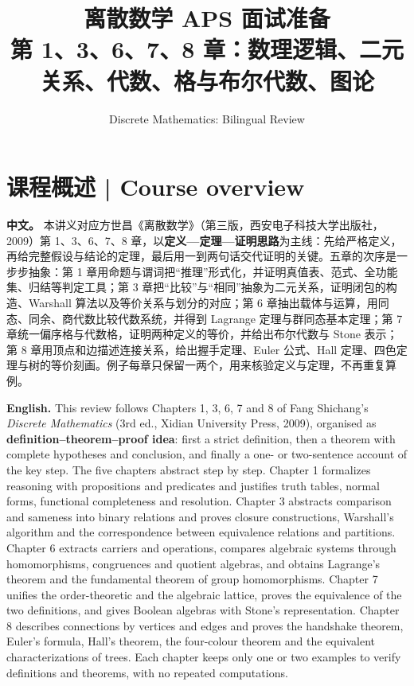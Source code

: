 \documentclass[UTF8,11pt,a4paper]{ctexart}
\title{离散数学 APS 面试准备\\[4pt]\large 第 1、3、6、7、8 章：数理逻辑、二元关系、代数、格与布尔代数、图论}
\author{Discrete Mathematics: Bilingual Review}
\date{}
\newcommand{\APS}[2]{\par\noindent\textbf{中文。} #1\par\noindent\textbf{English.} #2\par}
\begin{document}
\maketitle
\section*{课程概述 | Course overview}
\APS{本讲义对应方世昌《离散数学》（第三版，西安电子科技大学出版社，2009）第 1、3、6、7、8 章，以\textbf{定义—定理—证明思路}为主线：先给严格定义，再给完整假设与结论的定理，最后用一到两句话交代证明的关键。五章的次序是一步步抽象：第 1 章用命题与谓词把“推理”形式化，并证明真值表、范式、全功能集、归结等判定工具；第 3 章把“比较”与“相同”抽象为二元关系，证明闭包的构造、Warshall 算法以及等价关系与划分的对应；第 6 章抽出载体与运算，用同态、同余、商代数比较代数系统，并得到 Lagrange 定理与群同态基本定理；第 7 章统一偏序格与代数格，证明两种定义的等价，并给出布尔代数与 Stone 表示；第 8 章用顶点和边描述连接关系，给出握手定理、Euler 公式、Hall 定理、四色定理与树的等价刻画。例子每章只保留一两个，用来核验定义与定理，不再重复算例。}{This review follows Chapters 1, 3, 6, 7 and 8 of Fang Shichang's \emph{Discrete Mathematics} (3rd ed., Xidian University Press, 2009), organised as \textbf{definition--theorem--proof idea}: first a strict definition, then a theorem with complete hypotheses and conclusion, and finally a one- or two-sentence account of the key step. The five chapters abstract step by step. Chapter 1 formalizes reasoning with propositions and predicates and justifies truth tables, normal forms, functional completeness and resolution. Chapter 3 abstracts comparison and sameness into binary relations and proves closure constructions, Warshall's algorithm and the correspondence between equivalence relations and partitions. Chapter 6 extracts carriers and operations, compares algebraic systems through homomorphisms, congruences and quotient algebras, and obtains Lagrange's theorem and the fundamental theorem of group homomorphisms. Chapter 7 unifies the order-theoretic and the algebraic lattice, proves the equivalence of the two definitions, and gives Boolean algebras with Stone's representation. Chapter 8 describes connections by vertices and edges and proves the handshake theorem, Euler's formula, Hall's theorem, the four-colour theorem and the equivalent characterizations of trees. Each chapter keeps only one or two examples to verify definitions and theorems, with no repeated computations.}
\end{document}
